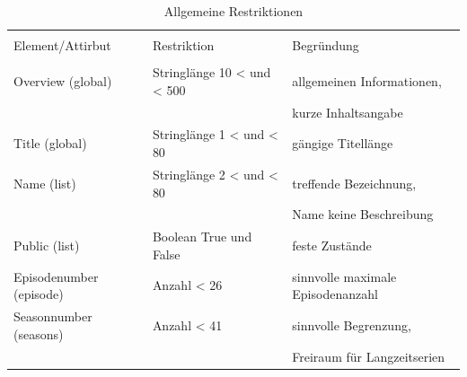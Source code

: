 \begin{table}[H]
\caption{Allgemeine Restriktionen}


\begin{tabular}{l l l}
\\ [-0.5ex]

\hline\hline
\\ [-0.5ex]
Element/Attirbut & Restriktion & Begründung
\\ [1.5ex]
\hline
\\ [-0.5ex]
Overview (global) & Stringlänge 10 < und < 500 & allgemeinen Informationen,\\[1ex]
&&kurze Inhaltsangabe\\[3ex]
Title (global) & Stringlänge 1 < und < 80 & gängige Titellänge\\[3ex]
Name (list) & Stringlänge 2 < und < 80 & treffende Bezeichnung,\\[1ex]
&&Name keine Beschreibung \\[3ex]
Public (list) & Boolean True und False & feste Zustände \\[3ex]
Episodenumber (episode) & Anzahl < 26 & sinnvolle maximale Episodenanzahl\\[3ex]
Seasonnumber (seasons) & Anzahl < 41 & sinnvolle Begrenzung, \\[1ex]
&&Freiraum für Langzeitserien \\[2ex]

\hline
\end{tabular}
\label{tab:restriktionenderxsd}
\end{table}


